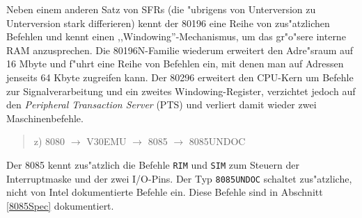 \documentclass[12pt,a4paper,twoside]{report}
\newcommand{\tty}[1]{{\tt #1}}
\begin{document}
Neben einem anderen Satz von SFRs (die "ubrigens von Unterversion zu
Unterversion stark differieren) kennt der 80196 eine Reihe von
zus"atzlichen Befehlen und kennt einen ,,Windowing''-Mechanismus, um
das gr"o"sere interne RAM anzusprechen.  Die 80196N-Familie wiederum
erweitert den Adre"sraum auf 16 Mbyte und f"uhrt eine Reihe von
Befehlen ein, mit denen man auf Adressen jenseits 64 Kbyte zugreifen
kann.  Der 80296 erweitert den CPU-Kern um Befehle zur Signalverarbeitung
und ein zweites Windowing-Register, verzichtet jedoch auf den {\em
Peripheral Transaction Server} (PTS) und verliert damit wieder zwei
Maschinenbefehle.
\begin{quote}
z) 8080 $\rightarrow$ V30EMU $\rightarrow$ 8085 $\rightarrow$ 8085UNDOC
\end{quote}
Der 8085 kennt zus"atzlich die Befehle \tty{RIM} und \tty{SIM} zum Steuern der
Interruptmaske und der zwei I/O-Pins.  Der Typ {\tt 8085UNDOC} schaltet
zus"atzliche, nicht von Intel dokumentierte Befehle ein.  Diese Befehle
sind in Abschnitt \ref{8085Spec} dokumentiert.
\end{document}
